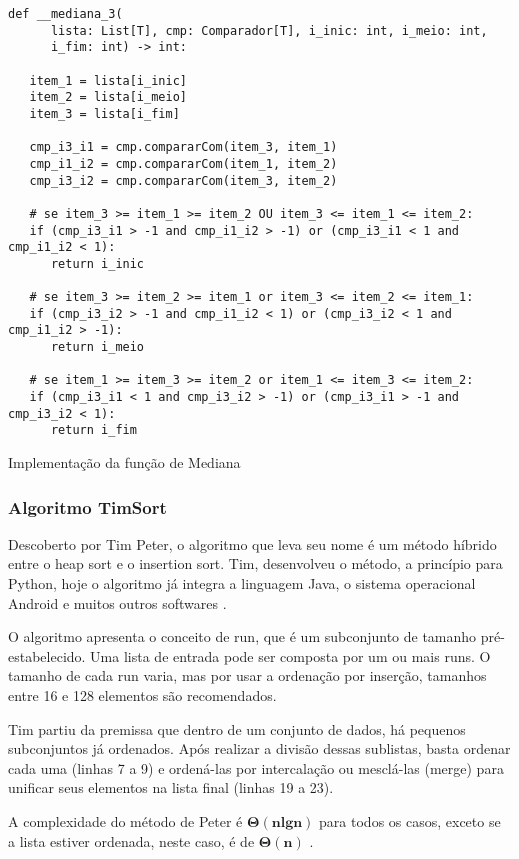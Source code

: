 \documentclass[a4paper,12pt]{scrartcl}
\begin{document}
\begin{listing}[H]
\begin{verbatim}
def __mediana_3(
      lista: List[T], cmp: Comparador[T], i_inic: int, i_meio: int,
      i_fim: int) -> int:

   item_1 = lista[i_inic]
   item_2 = lista[i_meio]
   item_3 = lista[i_fim]
   
   cmp_i3_i1 = cmp.compararCom(item_3, item_1)
   cmp_i1_i2 = cmp.compararCom(item_1, item_2)
   cmp_i3_i2 = cmp.compararCom(item_3, item_2)
   
   # se item_3 >= item_1 >= item_2 OU item_3 <= item_1 <= item_2:
   if (cmp_i3_i1 > -1 and cmp_i1_i2 > -1) or (cmp_i3_i1 < 1 and cmp_i1_i2 < 1): 
      return i_inic

   # se item_3 >= item_2 >= item_1 or item_3 <= item_2 <= item_1:
   if (cmp_i3_i2 > -1 and cmp_i1_i2 < 1) or (cmp_i3_i2 < 1 and cmp_i1_i2 > -1):
      return i_meio

   # se item_1 >= item_3 >= item_2 or item_1 <= item_3 <= item_2:
   if (cmp_i3_i1 < 1 and cmp_i3_i2 > -1) or (cmp_i3_i1 > -1 and cmp_i3_i2 < 1):
      return i_fim
\end{verbatim}
\caption{\footnotesize{Implementação da função de Mediana}}
\end{listing}

\subsubsection{Algoritmo TimSort}
Descoberto por Tim Peter, o algoritmo que leva seu nome é um método híbrido entre o heap sort e o insertion sort. Tim, desenvolveu o método, a princípio para Python, hoje o algoritmo já integra a linguagem Java, o sistema operacional Android e muitos outros softwares \cite{timsort}.

O algoritmo apresenta o conceito de run, que é um subconjunto de tamanho pré-estabelecido. Uma lista de entrada pode ser composta por um ou mais runs. O tamanho de cada run varia, mas por usar a ordenação por inserção, tamanhos entre 16 e 128 elementos são recomendados.

Tim partiu da premissa que dentro de um conjunto de dados, há pequenos subconjuntos já ordenados. Após realizar a divisão dessas sublistas, basta ordenar cada uma (linhas 7 a 9) e ordená-las por intercalação ou mesclá-las (merge) para unificar seus elementos na lista final (linhas 19 a 23).

A complexidade do método de Peter é $\pmb{\Theta(n lg n)}$ para todos os casos, exceto se a lista estiver ordenada, neste caso, é de $\pmb{\Theta(n)}$ \cite{timsort_comp}.
\end{document}

